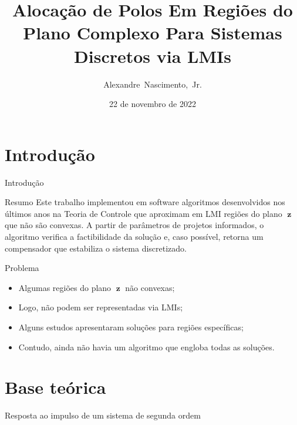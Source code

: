 \documentclass[aspectratio=169,11pt,t,xcolor={usenames,dvipsnames,x11names}]{beamer}
\title[]{Alocação de Polos Em Regiões do Plano Complexo Para Sistemas Discretos via LMIs}
\author[]{Alexandre~Nascimento,~Jr.}
\institute[]{
	Faculdade de Computação\\
	Universidade Federal de Mato Grosso do Sul
}
\date[]{22 de novembro de 2022}
\DeclareMathOperator{\z}{\textbf{z}}
\begin{document}
\frame{\maketitle}
\frame{\tableofcontents}

\section{Introdução}
\begin{frame}{Introdução}
	\begin{block}{Resumo}
		Este trabalho implementou em software algoritmos desenvolvidos nos últimos anos na Teoria de Controle que aproximam em LMI regiões do plano $\z$ que não são convexas. A partir de parâmetros de projetos informados, o algoritmo verifica a factibilidade da solução e, caso possível, retorna um compensador que estabiliza o sistema discretizado.
	\end{block}\pause
	\begin{alertblock}{Problema}
		\begin{itemize}
			\item Algumas regiões do plano $\z$ não convexas;
			\item Logo, não podem ser representadas via LMIs;
			\item Alguns estudos apresentaram soluções para regiões específicas;
			\item Contudo, ainda não havia um algoritmo que engloba todas as soluções.
		\end{itemize}
	\end{alertblock}
\end{frame}

\section{Base teórica}
\begin{frame}{Resposta ao impulso de um sistema de segunda ordem}
	\begin{figure}[!ht]
		\centering
		
	\end{figure}
\end{frame}
\end{document}
